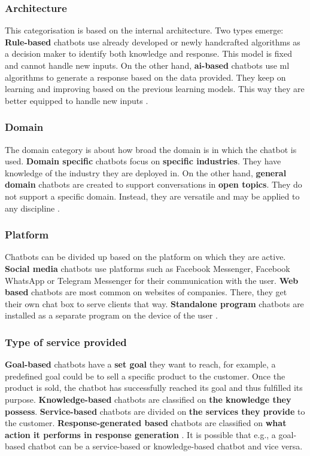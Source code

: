 \subsubsection{Architecture}
This categorisation is based on the internal architecture. Two types emerge: \textbf{Rule-based} chatbots use already developed or newly handcrafted algorithms as a decision maker to identify both knowledge and response. This model is fixed and cannot handle new inputs. On the other hand, \textbf{\acrshort{ai}-based} chatbots use \acrlong{ml} algorithms to generate a response based on the data provided. They keep on learning and improving based on the previous learning models. This way they are better equipped to handle new inputs \citep{Maroengsit2019}.

\subsubsection{Domain}
The domain category is about how broad the domain is in which the chatbot is used. \textbf{Domain specific} chatbots focus on \textbf{specific industries}. They have knowledge of the industry they are deployed in. On the other hand, \textbf{general domain} chatbots are created to support conversations in \textbf{open topics}. They do not support a specific domain. Instead, they are versatile and may be applied to any discipline \citep{Maroengsit2019}.

\subsubsection{Platform}
Chatbots can be divided up based on the platform on which they are active. \textbf{Social media} chatbots use platforms such as Facebook Messenger, Facebook WhatsApp or Telegram Messenger for their communication with the user. \textbf{Web based} chatbots are most common on websites of companies. There, they get their own chat box to serve clients that way. \textbf{Standalone program} chatbots are installed as a separate program on the device of the user \citep{Maroengsit2019, Xu2017, CICBA2018}.

\subsubsection{Type of service provided}
\textbf{Goal-based} chatbots have a \textbf{set goal} they want to reach, for example, a predefined goal could be to sell a specific product to the customer. Once the product is sold, the chatbot has successfully reached its goal and thus fulfilled its purpose. \textbf{Knowledge-based} chatbots are classified on \textbf{the knowledge they possess}. \textbf{Service-based} chatbots are divided on \textbf{the services they provide} to the customer. \textbf{Response-generated based} chatbots are classified on \textbf{what action it performs in response generation} \citep{Nuruzzaman2018}. It is possible that e.g., a goal-based chatbot can be a service-based or knowledge-based chatbot and vice versa.

